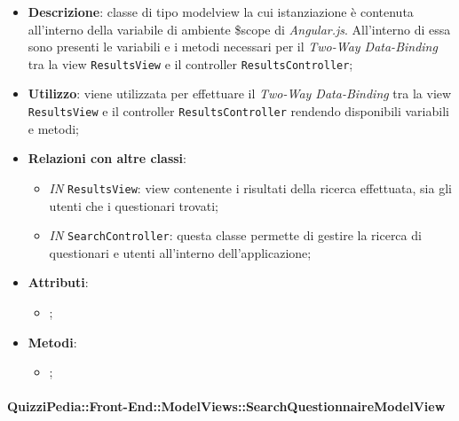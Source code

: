 	\begin{itemize}
		\item \textbf{Descrizione}: classe di tipo modelview la cui istanziazione è contenuta all'interno della variabile di ambiente \$scope di \textit{Angular.js}. All'interno di essa sono presenti le variabili e i metodi necessari per il \textit{Two-Way Data-Binding} tra la view \texttt{ResultsView} e il controller \texttt{ResultsController};
		\item \textbf{Utilizzo}: viene utilizzata per effettuare il \textit{Two-Way Data-Binding} tra la view \texttt{ResultsView} e il controller \texttt{ResultsController} rendendo disponibili variabili e metodi;
		\item \textbf{Relazioni con altre classi}: 
		\begin{itemize}
			\item \textit{IN} \texttt{ResultsView}: view contenente i risultati della ricerca effettuata, sia gli utenti che i questionari trovati; 
			\item \textit{IN} \texttt{SearchController}: questa classe permette di gestire la ricerca di questionari e utenti all’interno dell’applicazione;
		\end{itemize}
		\item \textbf{Attributi}: 
		\begin{itemize}
			\item ;
		\end{itemize}
		\item \textbf{Metodi}: 
		\begin{itemize}
			\item ;
		\end{itemize}
	\end{itemize}
	
	\paragraph{QuizziPedia::Front-End::ModelViews::SearchQuestionnaireModelView}
	
	\label{QuizziPedia::Front-End::ModelViews::SearchQuestionnaireModelView}
	
